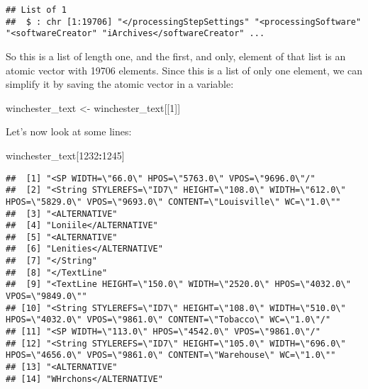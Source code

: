 \documentclass[
]{article}
\newenvironment{Shaded}{\begin{snugshade}}{\end{snugshade}}
\newcommand{\DecValTok}[1]{\textcolor[rgb]{0.00,0.00,0.81}{#1}}
\newcommand{\NormalTok}[1]{#1}
\newcommand{\OperatorTok}[1]{\textcolor[rgb]{0.81,0.36,0.00}{\textbf{#1}}}
\newcommand{\StringTok}[1]{\textcolor[rgb]{0.31,0.60,0.02}{#1}}
\begin{document}
\begin{verbatim}
## List of 1
##  $ : chr [1:19706] "</processingStepSettings" "<processingSoftware" "<softwareCreator" "iArchives</softwareCreator" ...
\end{verbatim}

So this is a list of length one, and the first, and only, element of that list is an atomic vector
with 19706 elements. Since this is a list of only one element, we can simplify it by saving the
atomic vector in a variable:

\begin{Shaded}
\begin{Highlighting}[]
\NormalTok{winchester\_text \textless{}{-}}\StringTok{ }\NormalTok{winchester\_text[[}\DecValTok{1}\NormalTok{]]}
\end{Highlighting}
\end{Shaded}

Let's now look at some lines:

\begin{Shaded}
\begin{Highlighting}[]
\NormalTok{winchester\_text[}\DecValTok{1232}\OperatorTok{:}\DecValTok{1245}\NormalTok{]}
\end{Highlighting}
\end{Shaded}

\begin{verbatim}
##  [1] "<SP WIDTH=\"66.0\" HPOS=\"5763.0\" VPOS=\"9696.0\"/"                                                                         
##  [2] "<String STYLEREFS=\"ID7\" HEIGHT=\"108.0\" WIDTH=\"612.0\" HPOS=\"5829.0\" VPOS=\"9693.0\" CONTENT=\"Louisville\" WC=\"1.0\""
##  [3] "<ALTERNATIVE"                                                                                                                
##  [4] "Loniile</ALTERNATIVE"                                                                                                        
##  [5] "<ALTERNATIVE"                                                                                                                
##  [6] "Lenities</ALTERNATIVE"                                                                                                       
##  [7] "</String"                                                                                                                    
##  [8] "</TextLine"                                                                                                                  
##  [9] "<TextLine HEIGHT=\"150.0\" WIDTH=\"2520.0\" HPOS=\"4032.0\" VPOS=\"9849.0\""                                                 
## [10] "<String STYLEREFS=\"ID7\" HEIGHT=\"108.0\" WIDTH=\"510.0\" HPOS=\"4032.0\" VPOS=\"9861.0\" CONTENT=\"Tobacco\" WC=\"1.0\"/"  
## [11] "<SP WIDTH=\"113.0\" HPOS=\"4542.0\" VPOS=\"9861.0\"/"                                                                        
## [12] "<String STYLEREFS=\"ID7\" HEIGHT=\"105.0\" WIDTH=\"696.0\" HPOS=\"4656.0\" VPOS=\"9861.0\" CONTENT=\"Warehouse\" WC=\"1.0\"" 
## [13] "<ALTERNATIVE"                                                                                                                
## [14] "WHrchons</ALTERNATIVE"
\end{verbatim}
\end{document}

